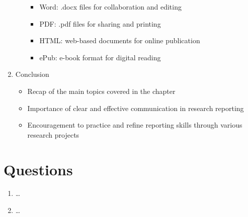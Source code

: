 \documentclass[
  letterpaper,
]{latex/krantz}
\providecommand{\tightlist}{%
  \setlength{\itemsep}{0pt}\setlength{\parskip}{0pt}}\usepackage{longtable,booktabs,array}
\begin{document}
\begin{enumerate}
\begin{itemize}
    \begin{itemize}
    \tightlist
    \item
      Word: .docx files for collaboration and editing
    \item
      PDF: .pdf files for sharing and printing
    \item
      HTML: web-based documents for online publication
    \item
      ePub: e-book format for digital reading
    \end{itemize}
  \end{itemize}
\item
  Conclusion

  \begin{itemize}
  \tightlist
  \item
    Recap of the main topics covered in the chapter
  \item
    Importance of clear and effective communication in research
    reporting
  \item
    Encouragement to practice and refine reporting skills through
    various research projects
  \end{itemize}
\end{enumerate}

\hypertarget{questions-11}{%
\section*{Questions}\label{questions-11}}


\begin{tcolorbox}[enhanced jigsaw, colframe=quarto-callout-note-color-frame, titlerule=0mm, coltitle=black, colback=white, opacitybacktitle=0.6, colbacktitle=quarto-callout-note-color!10!white, left=2mm, arc=.35mm, leftrule=.75mm, rightrule=.15mm, bottomtitle=1mm, toptitle=1mm, breakable, bottomrule=.15mm, title=\textcolor{quarto-callout-note-color}{\faInfo}\hspace{0.5em}{Conceptual questions}, toprule=.15mm, opacityback=0]

\begin{enumerate}
\def\labelenumi{\arabic{enumi}.}
\tightlist
\item
  \ldots{}
\item
  \ldots{}
\end{enumerate}

\end{tcolorbox}
\end{document}
